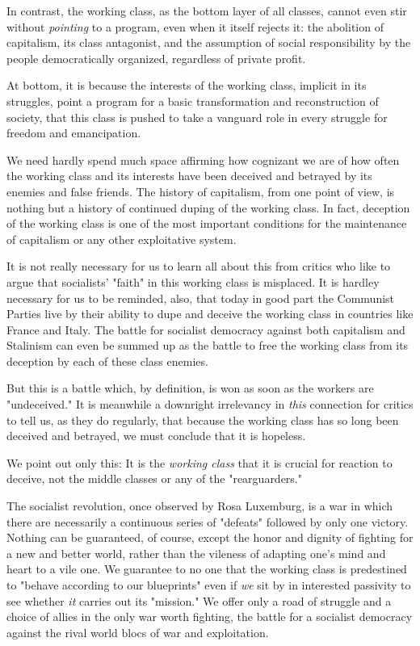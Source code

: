 In contrast, the working class, as the bottom layer of all classes, cannot even stir without \emph{pointing} to a program, even when it itself rejects it: the abolition of capitalism, its class antagonist, and the assumption of social responsibility by the people democratically organized, regardless of private profit.

At bottom, it is because the interests of the working class, implicit in its struggles, point a program for a basic transformation and reconstruction of society, that this class is pushed to take a vanguard role in every struggle for freedom and emancipation.

We need hardly spend much space affirming how cognizant we are of how often the working class and its interests have been deceived and betrayed by its enemies and false friends. The history of capitalism, from one point of view, is nothing but a history of continued duping of the working class. In fact, deception of the working class is one of the most important conditions for the maintenance of capitalism or any other exploitative system.

It is not really necessary for us to learn all about this from critics who like to argue that socialists' "faith" in this working class is misplaced. It is hardley necessary for us to be reminded, also, that today in good part the Communist Parties live by their ability to dupe and deceive the working class in countries like France and Italy. The battle for socialist democracy against both capitalism and Stalinism can even be summed up as the battle to free the working class from its deception by each of these class enemies.

But this is a battle which, by definition, is won as soon as the workers are "undeceived." It is meanwhile a downright irrelevancy in \emph{this} connection for critics to tell us, as they do regularly, that because the working class has so long been deceived and betrayed, we must conclude that it is hopeless.

We point out only this: It is the \emph{working class} that it is crucial for reaction to deceive, not the middle classes or any of the "rearguarders."

The socialist revolution, once observed by Rosa Luxemburg, is a war in which there are necessarily a continuous series of "defeats" followed by only one victory. Nothing can be guaranteed, of course, except the honor and dignity of fighting for a new and better world, rather than the vileness of adapting one's mind and heart to a vile one. We guarantee to no one that the working class is predestined to "behave according to our blueprints" even if \emph{we} sit by in interested passivity to see whether \emph{it} carries out its "mission." We offer only a road of struggle and a choice of allies in the only war worth fighting, the battle for a socialist democracy against the rival world blocs of war and exploitation.
